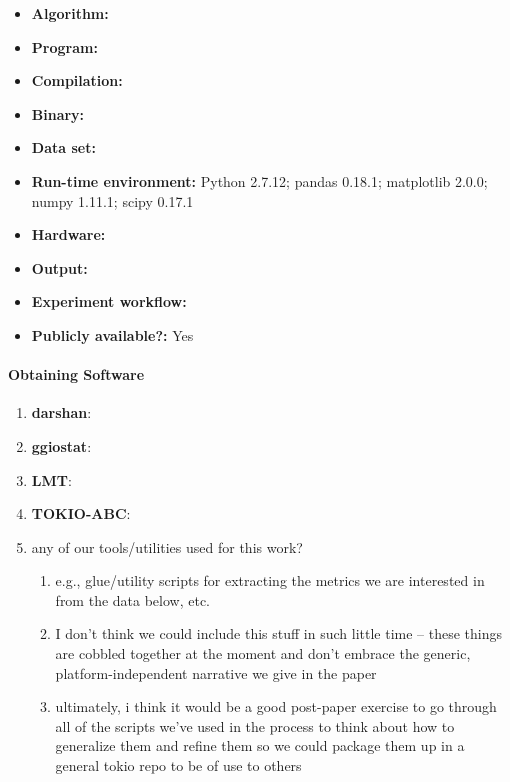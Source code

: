 \begin{itemize}
	\item \textbf{Algorithm:}
    \item \textbf{Program:}
    \item \textbf{Compilation:} 
    \item \textbf{Binary:}
    \item \textbf{Data set:}
    \item \textbf{Run-time environment:} Python 2.7.12; pandas 0.18.1; matplotlib 2.0.0; numpy 1.11.1; scipy 0.17.1
    \item \textbf{Hardware:}
    \item \textbf{Output:}
    \item \textbf{Experiment workflow:}
    \item \textbf{Publicly available?:} Yes
\end{itemize}

\paragraph{Obtaining Software}

\begin{enumerate}
	\item \textbf{darshan}:
    \item \textbf{ggiostat}:
    \item \textbf{LMT}:
    \item \textbf{TOKIO-ABC}:
    \item any of our tools/utilities used for this work?
	\begin{enumerate}
		\item e.g., glue/utility scripts for extracting the metrics we are interested in from the data below, etc.
		\item I don't think we could include this stuff in such little time -- these things are cobbled together at the moment and don't embrace the generic, platform-independent narrative we give in the paper
		\item ultimately, i think it would be a good post-paper exercise to go through all of the scripts we've used in the process to think about how to generalize them and refine them so we could package them up in a general tokio repo to be of use to others
	\end{enumerate}
\end{enumerate}

